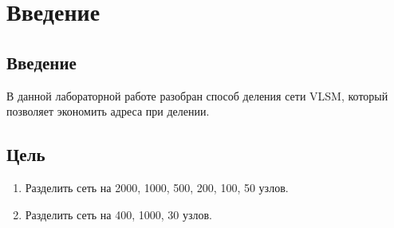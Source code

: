 \chapter{Введение}
\label{ch:intro}

\section{Введение}
В данной лабораторной работе разобран способ деления сети VLSM, который позволяет экономить адреса при делении.


\section{Цель}  

\begin{enumerate}
    \item Разделить сеть на 2000, 1000, 500, 200, 100, 50 узлов.
    \item Разделить сеть на 400, 1000, 30 узлов.
\end{enumerate}

  
\endinput 
